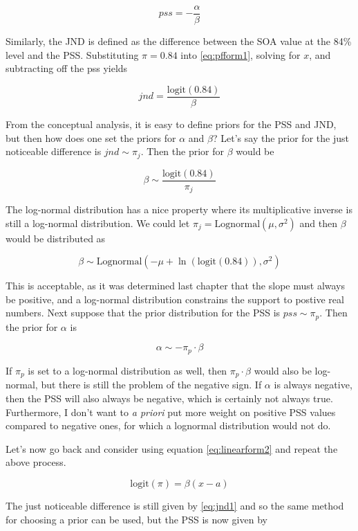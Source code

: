 \documentclass[11pt, oneside, openany]{scrbook}
\begin{document}
\[
pss = -\frac{\alpha}{\beta}
\]

Similarly, the JND is defined as the difference between the SOA value at the 84\% level and the PSS. Substituting \(\pi = 0.84\) into \eqref{eq:pfform1}, solving for \(x\), and subtracting off the pss yields

\begin{equation}
  jnd = \frac{\mathrm{logit}(0.84)}{\beta}
  \label{eq:jnd1}
\end{equation}

From the conceptual analysis, it is easy to define priors for the PSS and JND, but then how does one set the priors for \(\alpha\) and \(\beta\)? Let's say the prior for the just noticeable difference is \(jnd \sim \pi_j\). Then the prior for \(\beta\) would be

\[
\beta \sim \frac{\mathrm{logit}(0.84)}{\pi_j}
\]

The log-normal distribution has a nice property where its multiplicative inverse is still a log-normal distribution. We could let \(\pi_j = \mathrm{Lognormal}(\mu, \sigma^2)\) and then \(\beta\) would be distributed as

\[
\beta \sim \mathrm{Lognormal}(-\mu + \ln(\mathrm{logit}(0.84)), \sigma^2)
\]

This is acceptable, as it was determined last chapter that the slope must always be positive, and a log-normal distribution constrains the support to postive real numbers. Next suppose that the prior distribution for the PSS is \(pss \sim \pi_p\). Then the prior for \(\alpha\) is

\[
\alpha \sim -\pi_p \cdot \beta
\]

If \(\pi_p\) is set to a log-normal distribution as well, then \(\pi_p \cdot \beta\) would also be log-normal, but there is still the problem of the negative sign. If \(\alpha\) is always negative, then the PSS will also always be negative, which is certainly not always true. Furthermore, I don't want to \emph{a priori} put more weight on positive PSS values compared to negative ones, for which a lognormal distribution would not do.

Let's now go back and consider using equation \eqref{eq:linearform2} and repeat the above process.

\begin{equation}
  \mathrm{logit}(\pi) = \beta(x - a)
  \label{eq:pfform2}
\end{equation}

The just noticeable difference is still given by \eqref{eq:jnd1} and so the same method for choosing a prior can be used, but the PSS is now given by
\end{document}

